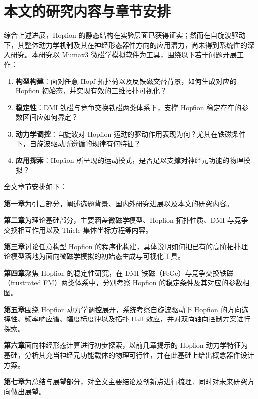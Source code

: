 \section{本文的研究内容与章节安排}

综合上述进展，Hopfion 的静态结构在实验层面已获得证实；然而在自旋波驱动下，其整体动力学机制及其在神经形态器件方向的应用潜力，尚未得到系统性的深入研究。本研究以 Mumax3 微磁学模拟软件为工具，围绕以下若干问题开展工作：

\begin{enumerate}[label=(\arabic*)]
  \item \textbf{构型构建}：面对任意 Hopf 拓扑荷以及反铁磁交替背景，如何生成对应的 Hopfion 初始态，并实现有效的三维拓扑可视化？
  \item \textbf{稳定性}：DMI 铁磁与竞争交换铁磁两类体系下，支撑 Hopfion 稳定存在的参数区间应如何界定？
  \item \textbf{动力学调控}：自旋波对 Hopfion 运动的驱动作用表现为何？尤其在铁磁条件下，自旋波驱动所遵循的规律有何特征？
  \item \textbf{应用探索}：Hopfion 所呈现的运动模式，是否足以支撑对神经元功能的物理模拟？
\end{enumerate}

全文章节安排如下：

\textbf{第一章}为引言部分，阐述选题背景、国内外研究进展以及本文的研究内容。

\textbf{第二章}为理论基础部分，主要涵盖微磁学模型、Hopfion 拓扑性质、DMI 与竞争交换相互作用以及 Thiele 集体坐标方程等内容。

\textbf{第三章}讨论任意构型 Hopfion 的程序化构建，具体说明如何把已有的高阶拓扑理论模型落地为面向微磁学模拟的初始态生成与可视化工具。

\textbf{第四章}聚焦 Hopfion 的稳定性研究，在 DMI 铁磁（FeGe）与竞争交换铁磁（frustrated FM）两类体系中，分别考察 Hopfion 的稳定条件及其对应的参数相图。

\textbf{第五章}围绕 Hopfion 动力学调控展开，系统考察自旋波驱动下 Hopfion 的方向选择性、频率响应谱、幅度标度律以及拓扑 Hall 效应，并对双向轴向控制方案进行探索。

\textbf{第六章}面向神经形态计算进行初步探索，以前几章揭示的 Hopfion 动力学特征为基础，分析其充当神经元功能载体的物理可行性，并在此基础上给出概念器件设计方案。

\textbf{第七章}为总结与展望部分，对全文主要结论及创新点进行梳理，同时对未来研究方向做出展望。
